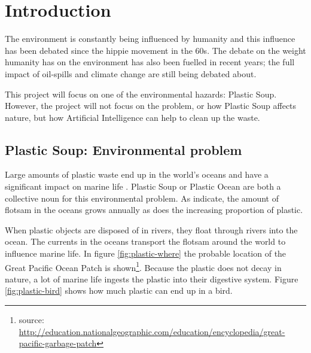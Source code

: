 \section{Introduction}
\label{sec:Introduction}
The environment is constantly being influenced by humanity and this influence has been debated since the hippie movement in the 60s.
The debate on the weight humanity has on the environment has also been fuelled in recent years; the full impact of oil-spills and climate change are still being debated about. \citepos

This project will focus on one of the environmental hazards: Plastic Soup.
However, the project will not focus on the problem, or how Plastic Soup affects nature, but how Artificial Intelligence can help to clean up the waste.



\subsection{Plastic Soup: Environmental problem}
\label{sec:Intro-Plastic Soup}
Large amounts of plastic waste end up in the world's oceans and have a significant impact on marine life \citep{barnes2005drifting}.
Plastic Soup or Plastic Ocean are both a collective noun for this environmental problem.
As \citeauthor{barnes2005drifting} indicate, the amount of flotsam in the oceans grows annually as does the increasing proportion of plastic.

When plastic objects are disposed of in rivers, they float through rivers into the ocean.
The currents in the oceans transport the flotsam around the world to influence marine life.
In figure \ref{fig:plastic-where} the probable location of the Great Pacific Ocean Patch is shown\footnote{source: \url{http://education.nationalgeographic.com/education/encyclopedia/great-pacific-garbage-patch} }.
Because the plastic does not decay in nature, a lot of marine life ingests the plastic into their digestive system. 
Figure \ref{fig:plastic-bird} shows how much plastic can end up in a bird.

